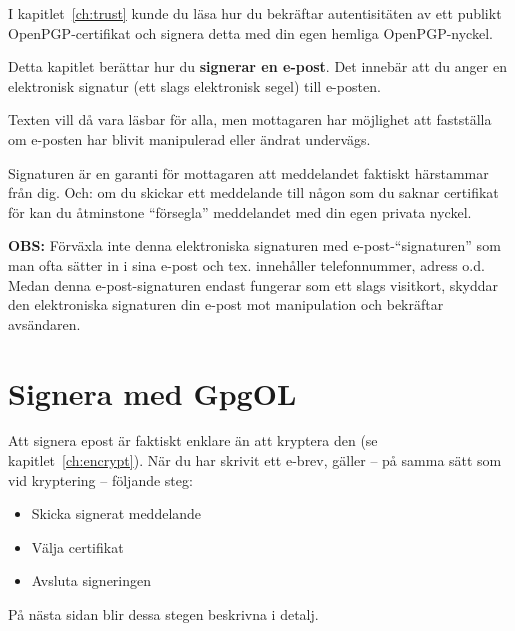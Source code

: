 \documentclass[a4paper,11pt, oneside,openright,titlepage,dvips]{scrbook}
\newcommand{\IncludeImage}[2][]{\texorhtml{%
\texttt{[image: \#2]}%
}{%
\htmlimg{#2.png}%
}}
\newcounter{chapter}
\newcounter{section}[chapter]
\begin{document}
I kapitlet~\ref{ch:trust} kunde du läsa hur du bekräftar
autentisitäten av ett publikt OpenPGP-certifikat och signera detta med din egen
hemliga OpenPGP-nyckel.

Detta kapitlet berättar hur du \textbf{signerar en e-post}. Det innebär att du 
anger en elektronisk signatur (ett slags elektronisk segel) till e-posten.

Texten vill då vara läsbar för alla, men mottagaren har möjlighet
att fastställa om e-posten har blivit manipulerad eller ändrat undervägs.

Signaturen är en garanti för mottagaren att meddelandet faktiskt
härstammar från dig. Och: om du skickar ett meddelande till någon
som du saknar certifikat för kan du åtminstone "`försegla"'
meddelandet med din egen privata nyckel.

\textbf{OBS:} Förväxla inte denna elektroniska signaturen med
e-post-"`signaturen"' som man ofta sätter in i sina e-post och 
tex. innehåller telefonnummer, adress o.d.
Medan denna e-post-signaturen endast fungerar som ett slags
visitkort, skyddar den elektroniska signaturen din e-post mot
manipulation och bekräftar avsändaren.

\begin{center}
\IncludeImage[width=0.4\textwidth]{man-with-signed-key}
\end{center}



\clearpage
\section{Signera med GpgOL}

Att signera epost är faktiskt enklare än att kryptera den (se 
kapitlet~\ref{ch:encrypt}). När du har skrivit ett e-brev, gäller
-- på samma sätt som vid kryptering -- följande steg:

\begin{itemize}
    \item Skicka signerat meddelande
    \item Välja certifikat
    \item Avsluta signeringen
\end{itemize}

På nästa sidan blir dessa stegen beskrivna i detalj.
\end{document}
